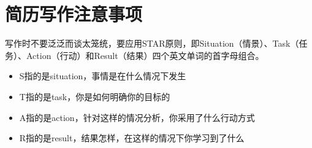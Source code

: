 \documentclass{resume}
\begin{document}
\section{简历写作注意事项}
写作时不要泛泛而谈太笼统，要应用STAR原则，即Situation（情景）、Task（任务）、Action（行动）和Result（结果）四个英文单词的首字母组合。
\begin{itemize}[parsep=0.5ex]
  \item S指的是situation，事情是在什么情况下发生
  \item T指的是task，你是如何明确你的目标的
  \item A指的是action，针对这样的情况分析，你采用了什么行动方式
  \item R指的是result，结果怎样，在这样的情况下你学习到了什么
\end{itemize}
\end{document}
